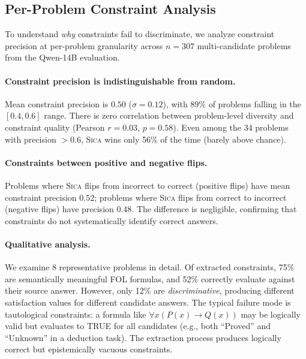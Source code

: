 \documentclass[11pt,a4paper]{article}
\newcommand{\sica}{\textsc{Sica}}
\begin{document}
\subsection{Per-Problem Constraint Analysis}
\label{sec:constraint_analysis}

To understand \emph{why} constraints fail to discriminate, we analyze constraint precision at per-problem granularity across $n=307$ multi-candidate problems from the Qwen-14B evaluation.

\paragraph{Constraint precision is indistinguishable from random.}
Mean constraint precision is $0.50$ ($\sigma=0.12$), with 89\% of problems falling in the $[0.4, 0.6]$ range.
There is zero correlation between problem-level diversity and constraint quality (Pearson $r=0.03$, $p=0.58$).
Even among the 34 problems with precision $> 0.6$, \sica{} wins only 56\% of the time (barely above chance).

\paragraph{Constraints between positive and negative flips.}
Problems where \sica{} flips from incorrect to correct (positive flips) have mean constraint precision $0.52$; problems where \sica{} flips from correct to incorrect (negative flips) have precision $0.48$.
The difference is negligible, confirming that constraints do not systematically identify correct answers.

\paragraph{Qualitative analysis.}
We examine 8 representative problems in detail.
Of extracted constraints, 75\% are semantically meaningful FOL formulas, and 52\% correctly evaluate against their source answer.
However, only 12\% are \emph{discriminative}, producing different satisfaction values for different candidate answers.
The typical failure mode is tautological constraints: a formula like $\forall x (P(x) \rightarrow Q(x))$ may be logically valid but evaluates to TRUE for all candidates (e.g., both ``Proved'' and ``Unknown'' in a deduction task).
The extraction process produces logically correct but epistemically vacuous constraints.
\end{document}
